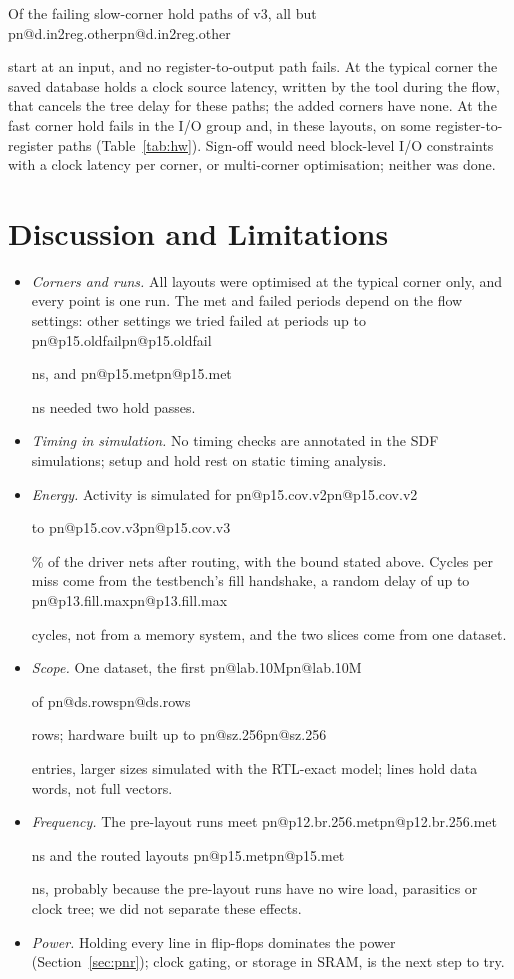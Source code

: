 \documentclass[conference,10pt]{IEEEtran}
\makeatletter
\newcommand{\R}[1]{\ifcsname pn@#1\endcsname\csname pn@#1\endcsname\else
  \PackageError{paper}{number key '#1' is not defined in macros.tex}{Run tools/make_paper_macros.py}\fi}
\makeatother
\begin{document}
Of the failing slow-corner hold paths of v3, all but \R{d.in2reg.other} start at an input, and no register-to-output
path fails. At the typical corner
the saved database holds a clock source latency, written by the tool during the flow, that cancels the tree delay
for these paths; the added corners have none. At the fast corner hold fails in the I/O group and, in these layouts,
on some register-to-register paths (Table~\ref{tab:hw}). Sign-off would need block-level I/O constraints with a clock
latency per corner, or multi-corner optimisation; neither was done.

\section{Discussion and Limitations}\label{sec:disc}
\begin{itemize}
\item \emph{Corners and runs.} All layouts were optimised at the typical corner only, and every point is one run. The
met and failed periods depend on the flow settings: other settings we tried failed at periods up to
\R{p15.oldfail} ns, and \R{p15.met} ns needed two hold passes.
\item \emph{Timing in simulation.} No timing checks are annotated in the SDF simulations; setup and hold rest on
static timing analysis.
\item \emph{Energy.} Activity is simulated for \R{p15.cov.v2} to \R{p15.cov.v3}\% of the driver nets after routing,
with the bound stated above. Cycles per miss come from the testbench's fill handshake, a random delay of up to
\R{p13.fill.max} cycles, not from a memory system, and the two slices come from one dataset.
\item \emph{Scope.} One dataset, the first \R{lab.10M} of \R{ds.rows} rows; hardware built up to \R{sz.256} entries,
larger sizes simulated with the RTL-exact model; lines hold data words, not full vectors.
\item \emph{Frequency.} The pre-layout runs meet \R{p12.br.256.met} ns and the routed layouts \R{p15.met} ns,
probably because the pre-layout runs have no wire load, parasitics or clock tree; we did not separate these effects.
\item \emph{Power.} Holding every line in flip-flops dominates the power (Section~\ref{sec:pnr}); clock gating, or
storage in SRAM, is the next step to try.
\end{itemize}
\end{document}
